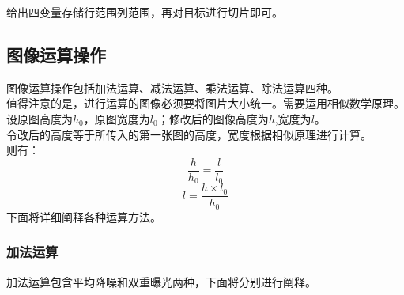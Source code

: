 \documentclass[11pt]{article}
\begin{document}
    给出四变量存储行范围列范围，再对目标进行切片即可。
    
    \subsection{图像运算操作}
    图像运算操作包括加法运算、减法运算、乘法运算、除法运算四种。\\
    值得注意的是，进行运算的图像必须要将图片大小统一。需要运用相似数学原理。\\
    设原图高度为$h_0$，原图宽度为$l_0$；修改后的图像高度为$h$,宽度为$l$。\\
    令改后的高度等于所传入的第一张图的高度，宽度根据相似原理进行计算。\\
    则有：
    $$\frac{h}{h_0}=\frac{l}{l_0} $$
    $$l=\frac{h\times l_0}{h_0}$$
    下面将详细阐释各种运算方法。
    \subsubsection{加法运算}
    加法运算包含平均降噪和双重曝光两种，下面将分别进行阐释。
\end{document}
